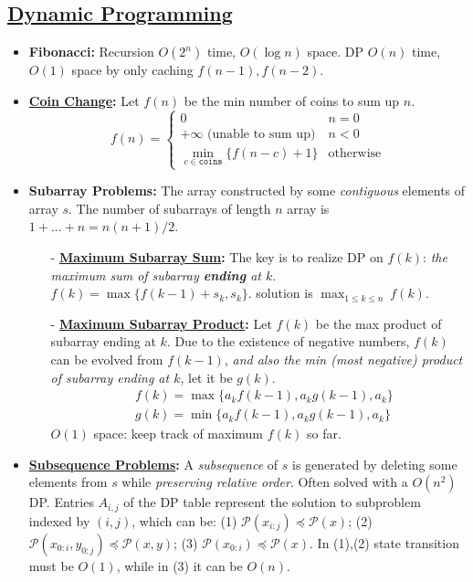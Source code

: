\documentclass[9pt, landscape]{article}
\begin{document}
\begin{multicols*}{3}
\subsection{\href{https://en.wikipedia.org/wiki/Dynamic_programming}{Dynamic Programming}}
\begin{itemize}
	\item \textbf{Fibonacci:} Recursion $O(2^n)$ time, $O(\log n)$ space. DP $O(n)$ time, $O(1)$ space by only caching $f(n-1), f(n-2)$.
	\item \textbf{\href{https://leetcode.com/problems/coin-change/solution/}{Coin Change}:} Let $f(n)$ be the min number of coins to sum up $n$. 
	$$
	f(n) = \begin{cases}
		0 & n=0 \\
		+\infty \text{ (unable to sum up)} & n<0\\
		\min\limits_{c\in \texttt{coins}}\{ f(n-c)+1 \} &  \text{otherwise}
	\end{cases}
	$$
	\item \textbf{Subarray Problems:} The array constructed by some \textit{contiguous} elements of array $s$. The number of subarrays of length $n$ array is $1+...+n = n(n+1)/2$.
	\begin{itemize}[leftmargin=10pt,noitemsep,topsep=0pt,partopsep=0pt]
		\item[-] \textbf{\href{https://leetcode.com/problems/maximum-subarray/}{Maximum Subarray Sum}:} The key is to realize DP on $f(k)$: \textit{the maximum sum of subarray \textbf{ending} at $k$}. $f(k) = \max\{ f(k-1)+s_k, s_k \}$. solution is $\max_{1\leq k\leq n}~f(k)$.
		\item[-] \textbf{\href{https://leetcode.com/problems/maximum-product-subarray/submissions/}{Maximum Subarray Product}:} Let $f(k)$ be the max product of subarray ending at $k$. Due to the existence of negative numbers, $f(k)$ can be evolved from $f(k-1)$, \textit{and also the min (most negative) product of subarray ending at $k$}, let it be $g(k)$.
		\begin{equation*}
			\begin{split}
				& f(k) = \max\{a_k f(k-1), a_k g(k-1), a_k\} \\
				& g(k) = \min\{a_k f(k-1), a_k g(k-1), a_k\}
			\end{split}
		\end{equation*}
		$O(1)$ space: keep track of maximum $f(k)$ so far.
	\end{itemize}
	\item \textbf{\href{https://labuladong.gitbook.io/algo/dong-tai-gui-hua-xi-lie/zi-xu-lie-wen-ti-mo-ban}{Subsequence Problems}:} A \textit{subsequence} of $s$ is generated by deleting some elements from $s$ while \textit{preserving relative order}. Often solved with a $O(n^2)$ DP. Entries $A_{i,j}$ of the DP table represent the solution to subproblem indexed by $(i,j)$, which can be: (1) $\mathcal{P}(x_{i:j}) \preceq \mathcal{P}(x)$; (2) $\mathcal{P}(x_{0:i}, y_{0:j}) \preceq \mathcal{P}(x, y)$; (3) $\mathcal{P}(x_{0:i}) \preceq \mathcal{P}(x)$. In (1),(2) state transition must be $O(1)$, while in (3) it can be $O(n)$.

\end{itemize}
\end{multicols*}
\end{document}
